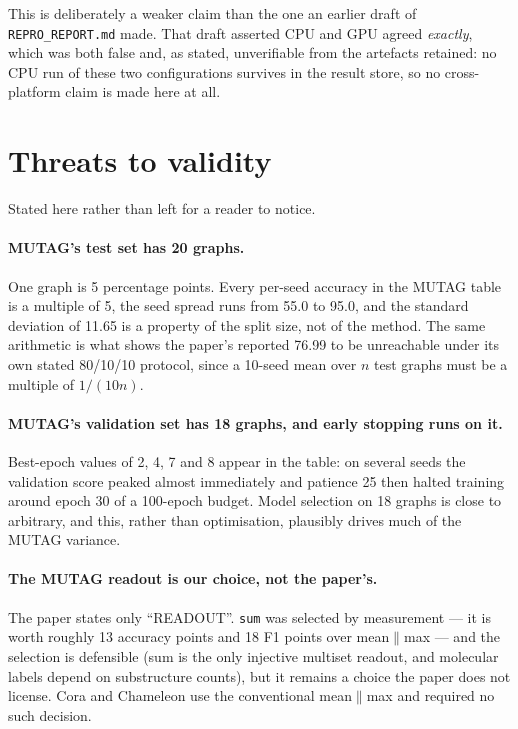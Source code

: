 \documentclass[11pt,a4paper]{article}
\begin{document}
This is deliberately a weaker claim than the one an earlier draft of \texttt{REPRO\_REPORT.md}
made. That draft asserted CPU and GPU agreed \emph{exactly}, which was both false and, as stated,
unverifiable from the artefacts retained: no CPU run of these two configurations survives in the
result store, so no cross-platform claim is made here at all.

\section{Threats to validity}
\label{sec:threats}

Stated here rather than left for a reader to notice.

\paragraph{MUTAG's test set has 20 graphs.} One graph is 5 percentage points. Every per-seed
accuracy in the MUTAG table is a multiple of 5, the seed spread runs from 55.0 to 95.0, and the
standard deviation of 11.65 is a property of the split size, not of the method. The same arithmetic
is what shows the paper's reported 76.99 to be unreachable under its own stated 80/10/10 protocol,
since a 10-seed mean over $n$ test graphs must be a multiple of $1/(10n)$.

\paragraph{MUTAG's validation set has 18 graphs, and early stopping runs on it.} Best-epoch values
of 2, 4, 7 and 8 appear in the table: on several seeds the validation score peaked almost
immediately and patience 25 then halted training around epoch 30 of a 100-epoch budget. Model
selection on 18 graphs is close to arbitrary, and this, rather than optimisation, plausibly drives
much of the MUTAG variance.

\paragraph{The MUTAG readout is our choice, not the paper's.} The paper states only ``READOUT''.
\texttt{sum} was selected by measurement --- it is worth roughly 13 accuracy points and 18 F1
points over mean$\|$max --- and the selection is defensible (sum is the only injective multiset
readout, and molecular labels depend on substructure counts), but it remains a choice the paper
does not license. Cora and Chameleon use the conventional mean$\|$max and required no such
decision.
\end{document}
